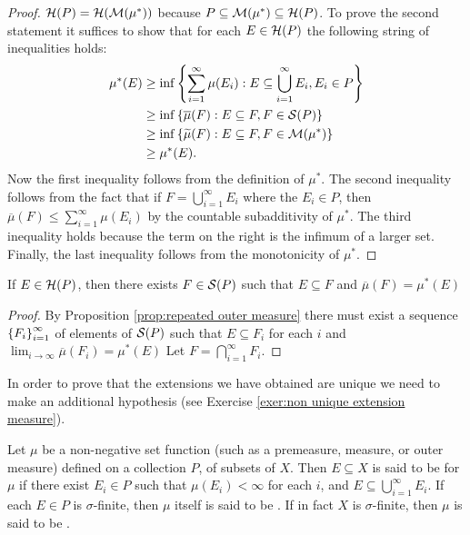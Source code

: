 \begin{proof}

${\cal H}(P)={\cal H}({\cal M}(\mu^*))$ because $P\subseteq{\cal M}(\mu^*)\subseteq{\cal H}(P)$. To prove the second statement it suffices to show that for each $E\in{\cal H}(P)$ the following string of inequalities holds:
\begin{align*}
    \mu^*(E)&\geq\inf\left\{\sum_{i=1}^\infty\mu(E_i):E\subseteq\bigcup_{i=1}^\infty E_i,E_i\in P\right\}\\
            &\geq\inf\left\{\overline{\mu}(F):E\subseteq F,F\in{\cal S}(P)\right\}\\
            &\geq\inf\left\{\widetilde{\mu}(F):E\subseteq F,F\in{\cal M}(\mu^*)\right\}\\
            &\geq\mu^*(E).
\end{align*}
Now the first inequality follows from the definition of $\mu^*$. The second inequality follows from the fact that if $F=\bigcup_{i=1}^\infty E_i$ where the $E_i\in P$, then $\overline{\mu}(F)\leq\sum_{i=1}^\infty\mu(E_i)$ by the countable subadditivity of $\mu^*$. The third inequality holds because the term on the right is the infimum of a larger set. Finally, the last inequality follows from the monotonicity of $\mu^*$.
\end{proof}

\begin{corollary}\label{cor:measure of hereditary wrt outer measure}
If $E\in{\cal H}(P)$, then there exists $F\in{\cal S}(P)$ such that $E\subseteq F$ and $\overline{\mu}(F)=\mu^*(E)$
\end{corollary}
\begin{proof}
By Proposition \ref{prop:repeated outer measure} there must exist a sequence $\left\{F_i\right\}_{i=1}^\infty$ of elements of ${\cal S}(P)$ such that $E\subseteq F_i$ for each $i$ and $\lim _{i\to\infty}\overline{\mu}(F_i)=\mu^*(E)$ Let $F=\bigcap_{i=1}^\infty F_i$.
\end{proof}

In order to prove that the extensions we have obtained are unique we need to make an additional hypothesis (see Exercise \ref{exer:non unique extension measure}).

\begin{definition}
Let $\mu$ be a non-negative set function (such as a premeasure, measure, or outer measure) defined on a collection $P$, of subsets of $X$. Then $E\subseteq X$ is said to be  for $\mu$ if there exist $E_i\in P$ such that $\mu(E_i)<\infty$ for each $i$, and $E\subseteq\bigcup_{i=1}^\infty E_i$. If each $E\in P$ is $\sigma$-finite, then $\mu$ itself is said to be . If in fact $X$ is $\sigma$-finite, then $\mu$ is said to be .
\end{definition}

